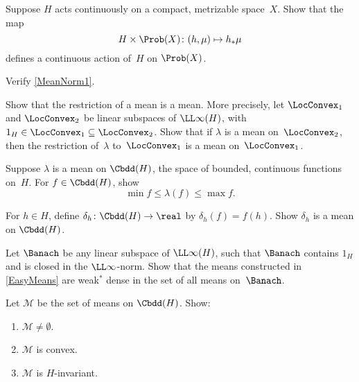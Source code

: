 \begin{exercises}
\item Suppose $H$ acts continuously on a compact, metrizable space~$X$. Show that the map
	$$ H \times \Prob(X) \colon (h,\mu) \mapsto h_* \mu $$
defines a continuous action of~$H$ on $\Prob(X)$.



\item \label{MeanNorm1Ex}
Verify \cref{MeanNorm1}.

\item \label{MeanLtoC}
Show that the restriction of a mean is a mean. More precisely, let $\LocConvex_1$ and $\LocConvex_2$ be linear subspaces of $\LL\infty(H)$, with $1_H \in \LocConvex_1 \subseteq \LocConvex_2$. Show that if $\lambda$ is a mean on~$\LocConvex_2$, then the restriction of~$\lambda$ to~$\LocConvex_1$ is a mean on~$\LocConvex_1$.

\item Suppose $\lambda$ is a mean on $\Cbdd(H)$, the space of bounded, continuous functions on~$H$. For $f \in \Cbdd(H)$, show 
	$$ \min f \le \lambda(f) \le \max  f .$$

\item For $h \in H$, define $\delta_h \colon \Cbdd(H) \to \real$ by $\delta_h(f) = f(h)$. Show $\delta_h$ is a mean on $\Cbdd(H)$.

\item \label{EasyMeansDense}
Let $\Banach$ be any linear subspace of $\LL\infty(H)$, such that $\Banach$ contains $1_H$ and is closed in the $\LL\infty$-norm. Show that the means constructed in \cref{EasyMeans} are weak$^*$ dense in the set of all means on~$\Banach$.

\item \label{SetOfMeans}
Let $\mathcal{M}$ be the set of means on $\Cbdd(H)$. Show:
	\begin{enumerate}
	\item \label{SetOfMeans-notempty}
	$\mathcal{M} \neq \emptyset$.
	\item $\mathcal{M}$ is convex.
	\item $\mathcal{M}$ is $H$-invariant.
	\end{enumerate}


\end{exercises}

